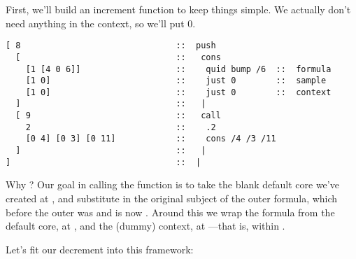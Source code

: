 First, we'll build an increment function to keep things simple.
We actually don't need anything in the context, so we'll put 0.

\begin{framed_shaded}
\begin{Verbatim}[fontsize=\relsize{-2.5},fontseries=b,commandchars=\\\{\}]
[ 8                               ::  push
  [                               ::   cons
    [1 [4 0 6]]                   ::    quid bump /6  ::  formula
    [1 0]                         ::    just 0        ::  sample
    [1 0]                         ::    just 0        ::  context
  ]                               ::   |
  [ 9                             ::   call
    2                             ::    .2
    [0 4] [0 3] [0 11]            ::    cons /4 /3 /11
  ]                               ::   |
]                                 ::  |
\end{Verbatim}
\end{framed_shaded}
Why \kode{[[0 4] [0 3] [0 11]]}?  Our goal in calling the function is
to take the blank default core we've created at , and
substitute in the original subject of the outer formula, which
before the outer  was  and is now .  Around this
we wrap the formula from the default core, at , and the
(dummy) context, at ---that is,  within .

Let's fit our decrement into this framework:


